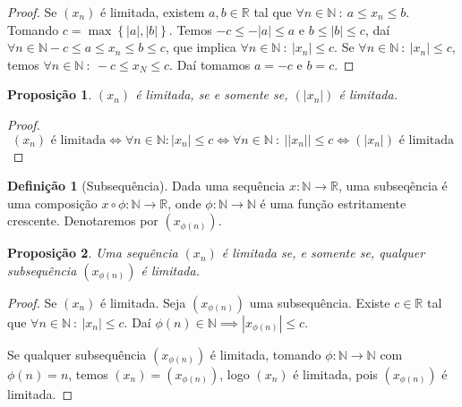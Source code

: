 \documentclass{article}
\newtheorem{prop}{Proposição}[section]
\theoremstyle{theorem}
\theoremstyle{lemma}
\theoremstyle{definition}
\newtheorem{definicao}{Definição}[section]
\theoremstyle{remark}
\begin{document}
   \begin{proof}
	   Se $(x_n)$ é limitada, existem $a,b\in \mathbb{R}$ tal que $\forall n \in \mathbb{N} \: : \: a\leq x_n \leq b $. Tomando $c = \max\left\{ |a|, |b| \right\}$. Temos $ -c \leq -|a| \leq a $ e $b \leq |b| \leq c$, daí  $\forall n \in \mathbb{N} -c \leq a \leq  x_n  \leq b \leq c$, que implica $\forall n \in \mathbb{N} \: : \: |x_n| \leq c$.
	   Se $\forall n \in \mathbb{N} \: : \: |x_n| \leq c$, temos  $\forall n \in \mathbb{N} \: : \: -c \leq x_N \leq c$. Daí tomamos $a = -c$ e $b = c$.
   \end{proof}
   \begin{prop}
	   $(x_n)$ é limitada, se e somente se,   $(|x_n|)$ é limitada.
   \end{prop}
   \begin{proof}
	   $$(x_n) \text{ é limitada} \iff \forall n \in \mathbb{N} :   |x_n| \leq c \iff \forall n \in \mathbb{N} \: : \: ||x_n|| \leq c \iff (|x_n|) \text{ é limitada} $$
   \end{proof}
   \begin{definicao}[Subsequência]
	   Dada uma sequência $x: \mathbb{N} \to \mathbb{R}$, uma subseqência é uma composição $x \circ \phi : \mathbb{N} \to \mathbb{R}$, onde  $\phi : \mathbb{N} \to \mathbb{N}$ é uma função estritamente crescente. Denotaremos por $(x_{\phi(n)})$.
   \end{definicao}
\begin{prop}
	Uma sequência $(x_n)$ é limitada se, e somente se, qualquer subsequência $(x_{\phi(n)})$ é limitada.
\end{prop}
\begin{proof}
	Se $(x_n)$ é limitada. Seja $(x_{\phi(n)})$ uma subsequência. Existe $c\in \mathbb{R}$ tal que $\forall n\in \mathbb{N} \: : \: |x_n| \leq c$. Daí $\phi(n) \in \mathbb{N} \implies |x_{\phi(n)}| \leq c$.
	
	Se qualquer subsequência $(x_{\phi(n)})$ é limitada, tomando $\phi:\mathbb{N} \to \mathbb{N}$ com $\phi(n) = n$, temos $(x_n) = (x_{\phi(n)})$, logo $(x_n)$ é limitada, pois $(x_{\phi(n)})$ é limitada.
\end{proof}
\end{document}
